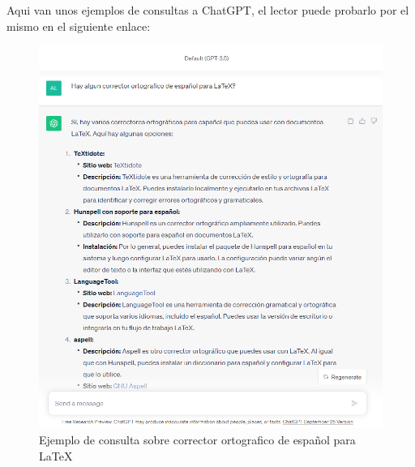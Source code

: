 \documentclass[runningheads]{llncs} %
\begin{document}
Aqui van unos ejemplos de consultas a ChatGPT, el lector puede probarlo por
el mismo en el siguiente enlace: 

\begin{figure}
    \centering
    \includegraphics[scale=0.55]{ej1-chatgpt.png}
    \caption{Ejemplo de consulta sobre corrector ortografico de español
    para LaTeX}
    \label{fig:chatgpt-ej1}
\end{figure}
\end{document}

